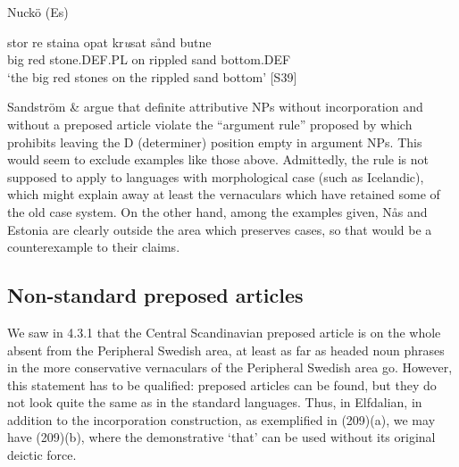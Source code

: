 
\item 

Nuckö (Es)



 \ea\label{}
\gll stor  re  staina  opat  kr\textit{u}sat  sånd  butne\\


big  red  stone.DEF.PL  on  rippled  sand  bottom.DEF\\

\glt ‘the big red stones on the rippled sand bottom’ [S39]

\z

Sandström \& \citet[110]{Holmberg2003} argue that definite attributive NPs without incorporation and without a preposed article violate the “argument rule” proposed by \citet{Delsing1993} which prohibits leaving the D (determiner) position empty in argument NPs. This would seem to exclude examples like those above. Admittedly, the rule is not supposed to apply to languages with morphological case (such as Icelandic), which might explain away at least the vernaculars which have retained some of the old case system. On the other hand, among the examples given, Nås and Estonia are clearly outside the area which preserves cases, so that would be a counterexample to their claims. 


\subsection{\rmfamily Non-standard preposed articles }
\label{bkm:Ref264372580}\label{bkm:Ref264372864}\label{bkm:Ref264372909}
We saw in 4.3.1 that the Central Scandinavian preposed article is on the whole absent from the Peripheral Swedish area, at least as far as headed noun phrases in the more conservative vernaculars of the Peripheral Swedish area go. However, this statement has to be qualified: preposed articles can be found, but they do not look quite the same as in the standard languages. Thus, in Elfdalian, in addition to the incorporation construction, as exemplified in (209)(a), we may have (209)(b), where the demonstrative  ‘that’ can be used without its original deictic force.

